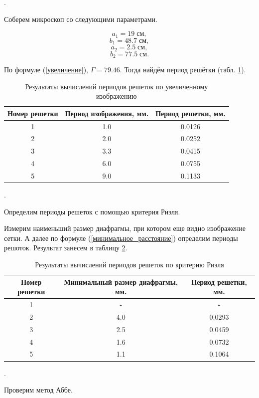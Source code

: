 \documentclass[a4paper, 12pt]{article}
\newcounter{Points}
\newcommand{\point}{\arabic{Points}. \addtocounter{Points}{1}}
\begin{document}
\point Соберем микроскоп со следующими параметрами. 

\[a_1 = 19      \; см,\]
\[b_1 = 48.7    \; см,\]
\[a_2 = 2.5     \; см,\]
\[b_2 = 77.5    \; см.\]

По формуле (\ref{увеличение}), $ \Gamma = 79.46$. Тогда найдём период решётки (табл. \ref{tabl:periods_microscope}).

\begin{table}[h]
\centering
\begin{tabular}{|c|c|c|}
\hline 
    Номер решетки & Период изображения, мм. & Период решетки, мм. \\ \hline
    1 & 1.0 & 0.0126 \\ \hline
    2 & 2.0 & 0.0252 \\ \hline
    3 & 3.3 & 0.0415 \\ \hline
    4 & 6.0 & 0.0755 \\ \hline
    5 & 9.0 & 0.1133 \\ \hline

\end{tabular}
\caption{Результаты вычислений периодов решеток по увеличенному изображению}
\label{tabl:periods_microscope}
\end{table}

\point Определим периоды решеток с помощью критерия Риэля.

Измерим наименьший размер диафрагмы, при котором еще видно изображение сетки. А далее по формуле (\ref{минимальное_расстояние}) определим периоды решоток. Результат занесем в таблицу \ref{tabl:periods_riel}.

\begin{table}[h]
\centering
\begin{tabular}{|c|c|c|}
\hline 
    Номер решетки & Минимальный размер диафрагмы, мм. & Период решетки, мм. \\ \hline
    1 & - & - \\ \hline
    2 & 4.0 & 0.0293 \\ \hline
    3 & 2.5 & 0.0459 \\ \hline
    4 & 1.6 & 0.0732 \\ \hline
    5 & 1.1 & 0.1064 \\ \hline

\end{tabular}
\caption{Результаты вычислений периодов решеток по критерию Риэля}
\label{tabl:periods_riel}
\end{table}
    

\point Проверим метод Аббе.
\end{document}
